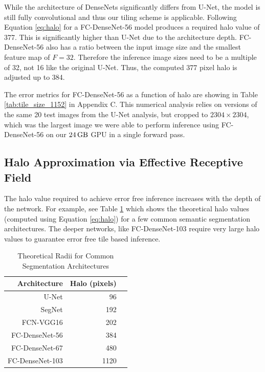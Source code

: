 \documentclass[10pt, indentfirst]{article}
\begin{document}
While the architecture of DenseNets significantly differs from U-Net, the model is still fully convolutional and thus our tiling scheme is applicable.
Following Equation \ref{eq:halo} for a FC-DenseNet-56 \citep{Jegou2017} model produces a required halo value of 377.
This is significantly higher than U-Net due to the architecture depth.
FC-DenseNet-56 also has a ratio between the input image size and the smallest feature map of $F = 32$.
Therefore the inference image sizes need to be a multiple of 32, not 16 like the original U-Net.
Thus, the computed 377 pixel halo is adjusted up to 384.

The error metrics for FC-DenseNet-56 as a function of halo are showing in Table \ref{tab:tile_size_1152} in Appendix C.
This numerical analysis relies on versions of the same 20 test images from the U-Net analysis, but cropped to $\num{2304} \times \num{2304}$, which was the largest image we were able to perform inference using FC-DenseNet-56 on our $\SI{24}{\giga\byte}$ GPU in a single forward pass.


\subsection{Halo Approximation via Effective Receptive Field}

The halo value required to achieve error free inference increases with the depth of the network.
For example, see Table \ref{tab:common_radii} which shows the theoretical halo values (computed using Equation \ref{eq:halo}) for a few common semantic segmentation architectures.
The deeper networks, like FC-DenseNet-103 require very large halo values to guarantee error free tile based inference.

\begin{table}
	\centering
	\caption{Theoretical Radii for Common Segmentation Architectures}
	\label{tab:common_radii}
	\begin{tabular}{r|r|r}
		Architecture & Halo (pixels)  \\ 
		\hline
		U-Net \citep{Ronneberger2015a} & 96 \\
		SegNet \citep{Badrinarayanan2015a} & 192 \\
		FCN-VGG16 \citep{Long2015} & 202 \\
		FC-DenseNet-56 \citep{Jegou2017} & 384 \\
		FC-DenseNet-67 \citep{Jegou2017} & 480 \\
		FC-DenseNet-103 \citep{Jegou2017} & 1120 \\
	\end{tabular}
\end{table}
\end{document}
